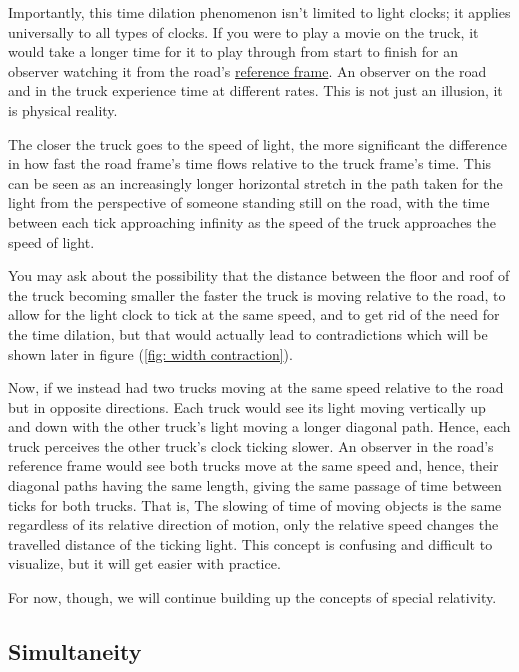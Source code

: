 Importantly, this time dilation phenomenon isn't limited to light clocks; it applies universally to all types of clocks.
If you were to play a movie on the truck, it would take a longer time for it to play through from start to finish for an observer watching it from the road's \hyperlink{def-Reference-frame}{reference frame}.
An observer on the road and in the truck experience time at different rates.
This is not just an illusion, it is physical reality.

The closer the truck goes to the speed of light, the more significant the difference in how fast the road frame's time flows relative to the truck frame's time.
This can be seen as an increasingly longer horizontal stretch in the path taken for the light from the perspective of someone standing still on the road, with the time between each tick approaching infinity as the speed of the truck approaches the speed of light.

You may ask about the possibility that the distance between the floor and roof of the truck becoming smaller the faster the truck is moving relative to the road, to allow for the light clock to tick at the same speed, and to get rid of the need for the time dilation, but that would actually lead to contradictions which will be shown later in figure (\ref{fig: width contraction}).

Now, if we instead had two trucks moving at the same speed relative to the road but in opposite directions.
Each truck would see its light moving vertically up and down with the other truck's light moving a longer diagonal path.
Hence, each truck perceives the other truck's clock ticking slower.
An observer in the road's reference frame would see both trucks move at the same speed and, hence, their diagonal paths having the same length, giving the same passage of time between ticks for both trucks.
That is, The slowing of time of moving objects is the same regardless of its relative direction of motion, only the relative speed changes the travelled distance of the ticking light.
This concept is confusing and difficult to visualize, but it will get easier with practice.

For now, though, we will continue building up the concepts of special relativity.


\subsection{Simultaneity} \label{subsect: Simultaneity}

